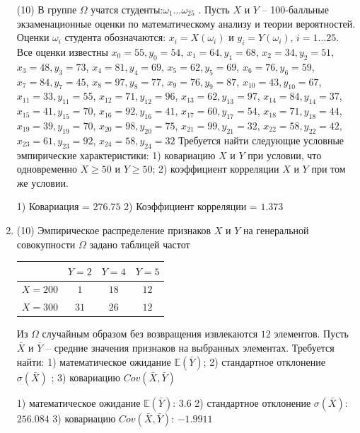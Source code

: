 \documentclass[a4paper,14pt]{article}
\begin{document}
\begin{enumerate}
(10) В группе $\Omega$ учатся студенты:$\omega _{1}...\omega _{25}$ . Пусть $X$ и $Y$ – 100-балльные экзаменационные оценки по
математическому анализу и теории вероятностей. Оценки $\omega _{i}$ студента обозначаются: $x _{i} = X(\omega _{i})$ и $y _{i} = Y(\omega _{i})$, $i = 1...25$. Все оценки известны
$x _{0} = 55, y _{0} = 54$, $x _{1} = 64, y _{1} = 68$, $x _{2} = 34, y _{2} = 51$, $x _{3} = 48, y _{3} = 73$, $x _{4} = 81, y _{4} = 69$, $x _{5} = 62, y _{5} = 69$, $x _{6} = 76, y _{6} = 59$, $x _{7} = 84, y _{7} = 45$, $x _{8} = 97, y _{8} = 77$, $x _{9} = 76, y _{9} = 87$, $x _{10} = 43, y _{10} = 67$, $x _{11} = 33, y _{11} = 55$, $x _{12} = 71, y _{12} = 96$, $x _{13} = 62, y _{13} = 97$, $x _{14} = 84, y _{14} = 37$, $x _{15} = 41, y _{15} = 70$, $x _{16} = 92, y _{16} = 41$, $x _{17} = 60, y _{17} = 54$, $x _{18} = 71, y _{18} = 44$, $x _{19} = 39, y _{19} = 70$, $x _{20} = 98, y _{20} = 75$, $x _{21} = 99, y _{21} = 32$, $x _{22} = 58, y _{22} = 42$, $x _{23} = 61, y _{23} = 92$, $x _{24} = 58, y _{24} = 32$
Требуется
найти следующие условные эмпирические характеристики: 1) ковариацию $X$ и $Y$ при условии, что одновременно $X \geqslant 50$
 и $Y \geqslant 50$; 2) коэффициент корреляции $X$ и $Y$ при том же условии.




1) Ковариация = $276.75$
2) Коэффициент корреляции = $1.373$


\item


(10) Эмпирическое распределение признаков $X$ и $Y$ на генеральной совокупности $\Omega$ задано таблицей частот  
 
\begin{tabular}{ | c | c | c | c | }
\hline
 & $Y = 2$ & $Y = 4$ & $Y = 5$  \\ \hline
$X = 200$ & $1$ & $18$ & $12$\\ \hline
$X = 300$ & $31$ & $26$ & $12$\\
\hline
\end{tabular}

Из $\Omega$ случайным образом без возвращения извлекаются $12$ элементов. 
Пусть $\bar X$ и $\bar Y$ – средние значения признаков на выбранных элементах. 
Требуется найти: 1) математическое ожидание $\mathbb{E}(\bar Y)$; 2) стандартное отклонение $\sigma(\bar X)$ ; 
3) ковариацию $Cov(\bar X, \bar Y)$




1) математическое ожидание $\mathbb{E}(\bar Y)$: $3.6$ 
2) стандартное отклонение $\sigma(\bar X)$: $256.084$
3) ковариацию $Cov(\bar X, \bar Y)$: $-1.9911$



\end{enumerate}
\end{document}

